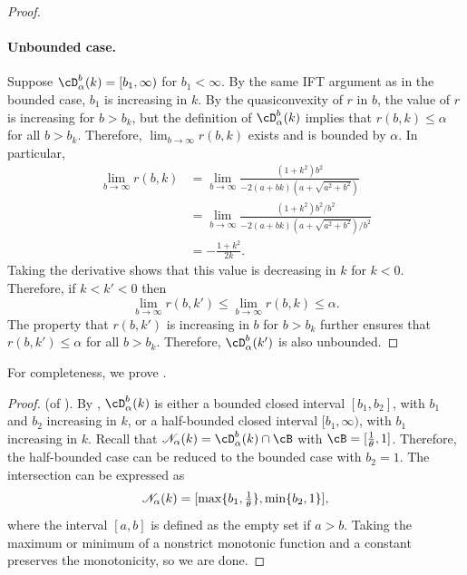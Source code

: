 \begin{proof}
	\paragraph{Unbounded case.}
	Suppose $\bdomain_\alpha(k) = [b_1, \infty)$ for $b_1 < \infty$.
	By the same IFT argument as in the bounded case, $b_1$ is increasing in $k$.
	By the quasiconvexity of $r$ in $b$,
	the value of $r$ is increasing for $b  > b_k$,
	but the definition of $\bdomain_\alpha(k)$ implies that
	$r(b, k) \leq \alpha$ for all $b > b_k$.
	Therefore, $\lim_{b \to \infty} r(b, k)$ exists
	and is bounded by $\alpha$.
	In particular,
	\begin{equation*}
		\begin{split}
			\lim_{b \to \infty} r(b, k)
			&=
			\lim_{b \to \infty}
			\frac{
				(1 + k^2) b^2
			}{
				-2(a + bk)(a + \sqrt{a^2 + b^2})
			}
			\\ &=
			\lim_{b \to \infty}
			\frac{
				(1 + k^2) b^2 / b^2
			}{
				-2(a + bk)(a + \sqrt{a^2 + b^2}) / b^2
			}
			\\ &=
			-
			\frac{
				1 + k^2
			}{
				2k
			}.
		\end{split}
	\end{equation*}
	Taking the derivative shows that this value is decreasing in $k$ for $k < 0$.
	Therefore, if $k < k' < 0$ then
	\[
		\lim_{b \to \infty} r(b, k') \leq \lim_{b \to \infty} r(b, k) \leq \alpha.
	\]
	The property that $r(b, k')$ is increasing in $b$ for $b > b_k$
	further ensures that
	$r(b, k') \leq \alpha$ for all $b > b_k$.
	Therefore, $\bdomain_\alpha(k')$ is also unbounded.
\end{proof}

\noindent For completeness, we prove .

\quad

\begin{proof} (of ).
	By ,
	$\bdomain_\alpha(k)$ is either
	a bounded closed interval $[b_1, b_2]$,
		with $b_1$ and $b_2$ increasing in $k$, or
	a half-bounded closed interval $[b_1, \infty)$,
		with $b_1$ increasing in $k$.
	Recall that $\suboptneighb{\alpha}{k} = \bdomain_\alpha(k) \cap \cB$
	with $\cB = [\recip \theta, 1]$.
	Therefore, the half-bounded case can be reduced to the bounded case with $b_2 = 1$.
	The intersection can be expressed as
	\[
		\mathscr{N}_{\alpha}(k) = [\max\{b_1, \textstyle \frac{1}{\theta}\}, \min\{b_2, 1\}],
	\]
	where the interval $[a, b]$ is defined as the empty set if $a > b$.
	Taking the maximum or minimum of a nonstrict monotonic function and a constant
	preserves the monotonicity, so we are done.
\end{proof}
